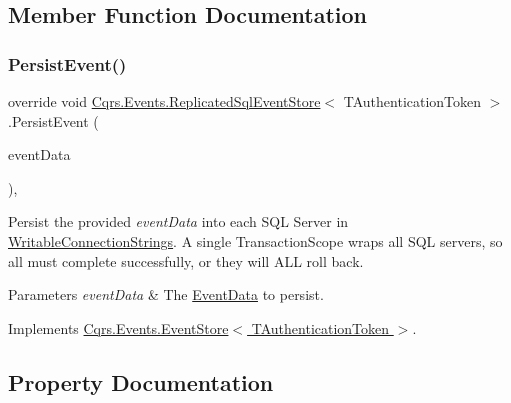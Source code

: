 \subsection{Member Function Documentation}
\mbox{\label{classCqrs_1_1Events_1_1ReplicatedSqlEventStore_aedff93a62c275a18d45ede6576fe2840_aedff93a62c275a18d45ede6576fe2840}} 
\subsubsection{\texorpdfstring{Persist\+Event()}{PersistEvent()}}
{\footnotesize\ttfamily override void \hyperlink{classCqrs_1_1Events_1_1ReplicatedSqlEventStore}{Cqrs.\+Events.\+Replicated\+Sql\+Event\+Store}$<$ T\+Authentication\+Token $>$.Persist\+Event (\begin{DoxyParamCaption}\item[{\hyperlink{classCqrs_1_1Events_1_1EventData}{Event\+Data}}]{event\+Data }\end{DoxyParamCaption})\hspace{0.3cm}{\ttfamily [protected]}, {\ttfamily [virtual]}}



Persist the provided {\itshape event\+Data}  into each S\+QL Server in \hyperlink{classCqrs_1_1Events_1_1ReplicatedSqlEventStore_ab2811e34d4f19fb0115a96f622050f68_ab2811e34d4f19fb0115a96f622050f68}{Writable\+Connection\+Strings}. A single Transaction\+Scope wraps all S\+QL servers, so all must complete successfully, or they will A\+LL roll back. 


\begin{DoxyParams}{Parameters}
{\em event\+Data} & The \hyperlink{classCqrs_1_1Events_1_1EventData}{Event\+Data} to persist.\\
\hline
\end{DoxyParams}


Implements \hyperlink{classCqrs_1_1Events_1_1EventStore_aedb71ca0ddf21220e323bc60ad7508cd_aedb71ca0ddf21220e323bc60ad7508cd}{Cqrs.\+Events.\+Event\+Store$<$ T\+Authentication\+Token $>$}.



\subsection{Property Documentation}
\mbox{\label{classCqrs_1_1Events_1_1ReplicatedSqlEventStore_ab2811e34d4f19fb0115a96f622050f68_ab2811e34d4f19fb0115a96f622050f68}} 
